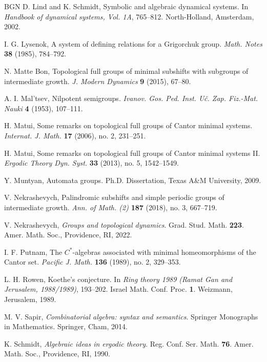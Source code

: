 \documentclass[12pt]{article}
\theoremstyle{definition}
\begin{document}
\begin{thebibliography}{BGN}
D. Lind and K. Schmidt, Symbolic and algebraic dynamical systems. In 
\emph{Handbook of dynamical systems, Vol. 1A}, 765--812.  North-Holland, 
Amsterdam, 2002.

I. G. Lysenok, A system of defining relations for a Grigorchuk group. 
\emph{Math. Notes} \textbf{38} (1985), 784--792.

N. Matte Bon, Topological full groups of minimal subshifts with subgroups 
of intermediate growth. \emph{J. Modern Dynamics} \textbf{9} (2015), 67--80.

A. I. Mal'tsev, Nilpotent semigroups. \emph{Ivanov. Gos. Ped. Inst. U\v{c}. 
Zap. Fiz.-Mat. Nauki} \textbf{4} (1953), 107--111.

H. Matui, Some remarks on topological full groups of Cantor minimal 
systems. \emph{Internat. J. Math.} \textbf{17} (2006), no. 2, 231--251.

H. Matui, Some remarks on topological full groups of Cantor minimal 
systems II. \emph{Ergodic Theory Dyn. Syst.} \textbf{33} (2013), no. 5, 
1542--1549.

Y. Muntyan, Automata groups. Ph.D. Dissertation, Texas A\&M University, 2009.

V. Nekrashevych, Palindromic subshifts and simple periodic groups of 
intermediate growth. \emph{Ann. of Math. (2)} \textbf{187} (2018), no. 3, 
667--719.

V. Nekrashevych, \emph{Groups and topological dynamics}. Grad. Stud. Math. 
\textbf{223}. Amer. Math. Soc., Providence, RI, 2022.

I. F. Putnam, The $C^*$-algebras associated with minimal homeomorphisms of 
the Cantor set. \emph{Pacific J. Math.} \textbf{136} (1989), no. 2, 
329--353.

L. H. Rowen, Koethe's conjecture. In \emph{Ring theory 1989 (Ramat Gan and 
Jerusalem, 1988/1989)}, 193--202. Israel Math. Conf. Proc. \textbf{1}. 
Weizmann, Jerusalem, 1989.

M. V. Sapir, \emph{Combinatorial algebra: syntax and semantics}. Springer 
Monographs in Mathematics. Springer, Cham, 2014.

K. Schmidt, \emph{Algebraic ideas in ergodic theory}.  Reg. Conf. Ser. 
Math. \textbf{76}.  Amer. Math. Soc., Providence, RI, 1990.  


\end{thebibliography}
\end{document}
